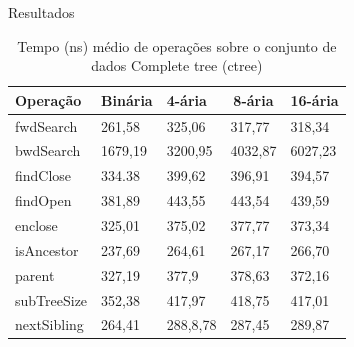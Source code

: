 \begin{frame}{Resultados}
\begin{table}[]
    \centering
    \caption[Tempo médio de operações]{Tempo (ns) médio de operações sobre o conjunto de dados Complete tree (ctree)}
    \begin{tabular}{lllll}
    \hline
    \multicolumn{1}{l}{\textbf{Operação}} & \multicolumn{1}{l}{\textbf{Binária}} & \multicolumn{1}{l}{\textbf{4-ária}} & \multicolumn{1}{c}{\textbf{8-ária}} & \multicolumn{1}{l}{\textbf{16-ária}} \\ \hline
    fwdSearch                               & 261,58                                & 325,06                               & 317,77                               & 318,34                                \\
    \rowcolor[HTML]{EFEFEF} 
    bwdSearch                               & 1679,19                                & 3200,95                              & 4032,87                              & 6027,23                               \\
    findClose                               & 334.38                                & 399,62                               & 396,91                               & 394,57                                \\
    \rowcolor[HTML]{EFEFEF} 
    findOpen                                & 381,89                                & 443,55                               & 443,54                               & 439,59                                \\
    enclose                                 & 325,01                                & 375,02                               & 377,77                               & 373,34                                \\
    \rowcolor[HTML]{EFEFEF} 
    isAncestor                              & 237,69                                & 264,61                               & 267,17                               & 266,70                                \\
    parent                                  & 327,19                                & 377,9                                & 378,63                               & 372,16                 \\ 
    \rowcolor[HTML]{EFEFEF} 
    subTreeSize                             & 352,38                                & 417,97                               & 418,75                               & 417,01                                \\
    nextSibling                             & 264,41                                & 288,8,78                             & 287,45                               & 289,87                                \\ \hline            
    \end{tabular}
    \end{table}
\end{frame}


